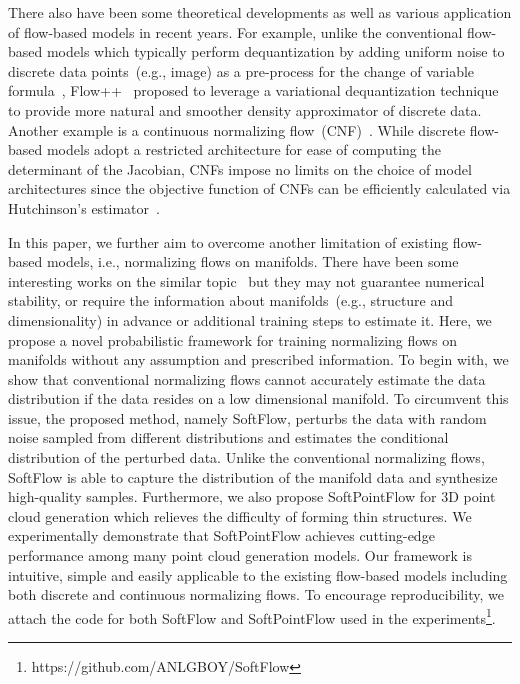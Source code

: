 \documentclass{article}
\begin{document}
There also have been some theoretical developments as well as various application of flow-based models in recent years. For example, unlike the conventional flow-based models which typically perform dequantization by adding uniform noise to discrete data points~(e.g., image) as a pre-process for the change of variable formula~\citep{dinh2016density,papamakarios2017masked}, Flow++~\citep{ho2019flow++} proposed to leverage a variational dequantization technique to provide more natural and smoother density approximator of discrete data. Another example is a continuous normalizing flow~(CNF)~\citep{chen2018neural, grathwohl2018ffjord}. While discrete flow-based models adopt a restricted architecture for ease of computing the determinant of the Jacobian, CNFs impose no limits on the choice of model architectures since the objective function of CNFs can be efficiently calculated via Hutchinson's estimator~\citep{hutchinson1990stochastic}.

In this paper, we further aim to overcome another limitation of existing flow-based models, i.e., normalizing flows on manifolds. There have been some interesting works on the similar topic~\citep{gemici2016normalizing, rezende2020normalizing, brehmer2020flows} but they may not guarantee numerical stability, or require the information about manifolds~(e.g., structure and dimensionality) in advance or additional training steps to estimate it. Here, we propose a novel probabilistic framework for training normalizing flows on manifolds without any assumption and prescribed information. To begin with, we show that conventional normalizing flows cannot accurately estimate the data distribution if the data resides on a low dimensional manifold. To circumvent this issue, the proposed method, namely SoftFlow, perturbs the data with random noise sampled from different distributions and estimates the conditional distribution of the perturbed data. Unlike the conventional normalizing flows, SoftFlow is able to capture the distribution of the manifold data and synthesize high-quality samples. Furthermore, we also propose SoftPointFlow for 3D point cloud generation which relieves the difficulty of forming thin structures. We experimentally demonstrate that SoftPointFlow achieves cutting-edge performance among many point cloud generation models. Our framework is intuitive, simple and easily applicable to the existing flow-based models including both discrete and continuous normalizing flows. To encourage reproducibility, we
attach the code for both SoftFlow and SoftPointFlow used in the experiments\footnote{https://github.com/ANLGBOY/SoftFlow}.
\end{document}
